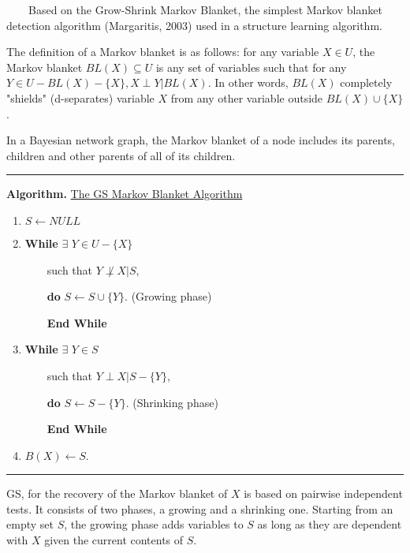 ~~~~Based on the Grow-Shrink Markov Blanket, the simplest Markov blanket detection algorithm (Margaritis, 2003) used in a structure learning algorithm.

The definition of a Markov blanket is as follows: for any variable $X \in U$, the Markov blanket $BL(X) \subseteq U$ is any set of variables such that for any $Y \in U - BL(X) - \{X\}, X \perp Y | BL(X)$. In other words, $BL(X)$ completely "shields" (d-separates) variable $X$ from any other variable outside $BL(X) \cup \{X\}$.

In a Bayesian network graph, the Markov blanket of a node includes its parents, children and other parents of all of its children.

\begin{center}\rule[0.5ex]{0.9\columnwidth}{1pt}\end{center}

\textbf{Algorithm.} \underline{The GS Markov Blanket Algorithm}

\begin{enumerate}
	\item $S \leftarrow NULL$
	
	\item \textbf{While} $\exists$ $Y\in U-\{X\}$
	
	~~~~such that $Y \not\perp X | S$,
	
	~~~~\textbf{do} $S \leftarrow S \cup \{Y\}$. (Growing phase)
	
	~~~~\textbf{End While}
	
	\item \textbf{While} $\exists$ $Y\in S$
	
	~~~~such that $Y \perp X | S - \{Y\}$,
	
	~~~~\textbf{do} $S \leftarrow S - \{Y\}$. (Shrinking phase)
	
	~~~~\textbf{End While}
	
	\item $B(X) \leftarrow S$.
\end{enumerate}

\begin{center}\rule[0.5ex]{0.9\columnwidth}{1pt}\end{center}

GS, for the recovery of the Markov blanket of $X$ is based on pairwise independent tests. It consists of two phases, a growing and a shrinking one. Starting from an empty set $S$, the growing phase adds variables to $S$ as long as they are dependent with $X$ given the current contents of $S$.